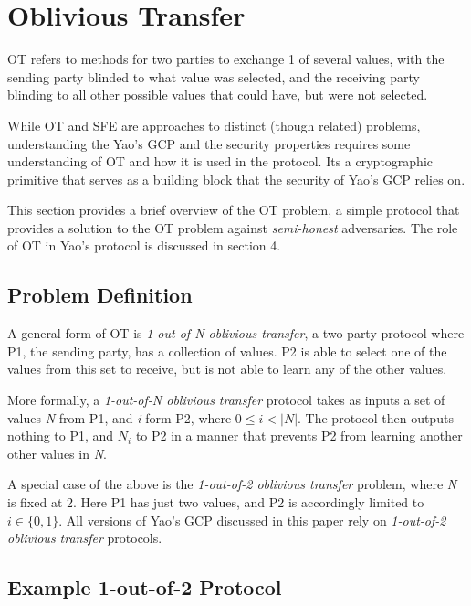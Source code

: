 \section{Oblivious Transfer}

\ac{OT} refers to methods for two parties to exchange 1 of several values, with the sending party blinded to what value was selected, and the receiving party blinding to all other possible values that could have, but were not selected.

While \ac{OT} and \ac{SFE} are approaches to distinct (though related) problems, understanding the Yao's \ac{GCP} and the security properties requires some understanding of \ac{OT} and how it is used in the protocol. Its a cryptographic primitive that serves as a building block that the security of Yao's \ac{GCP} relies on.

This section provides a brief overview of the \ac{OT} problem, a simple protocol that provides a solution to the \ac{OT} problem against \emph{semi-honest} adversaries. The role of \ac{OT} in Yao's protocol is discussed in section 4.

\subsection{Problem Definition}

A general form of \ac{OT} is \emph{1-out-of-N oblivious transfer}, a two party protocol where \ac{P1}, the sending party, has a collection of values. \ac{P2} is able to select one of the values from this set to receive, but is not able to learn any of the other values.

More formally, a \emph{1-out-of-N oblivious transfer} protocol takes as inputs a set of values \emph{N} from \ac{P1}, and \emph{i} form \ac{P2}, where
$0 \leq i < |N|$. The protocol then outputs nothing to \ac{P1}, and $N_i$ to \ac{P2} in a manner that prevents \ac{P2} from learning another other values in \emph{N}.

A special case of the above is the \emph{1-out-of-2 oblivious transfer} problem, where \emph{N} is fixed at 2.  Here \ac{P1} has just two values, and \ac{P2} is accordingly limited to $i \in \{0, 1\}$.  All versions of Yao's \ac{GCP} discussed in this paper rely on \emph{1-out-of-2 oblivious transfer} protocols.

\subsection{Example 1-out-of-2 Protocol}

